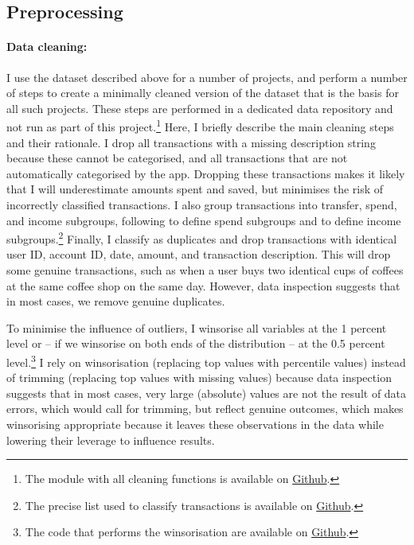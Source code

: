 \subsection{Preprocessing}%
\label{sub:preprocessing}

\paragraph{Data cleaning:}%
\label{par:data_cleaning}

I use the dataset described above for a number of projects, and perform a
number of steps to create a minimally cleaned version of the dataset that is
the basis for all such projects. These steps are performed in a dedicated data
repository and not run as part of this project.\footnote{The module with all
cleaning functions is available on
\href{https:/egithub.com/fabiangunzinger/mdb_eval/blob/f51e49c95c5884d2dc417be23921a8acd85aec9d/src/data/clean.py}{Github}.}
Here, I briefly describe the main cleaning steps and their rationale. I drop
all transactions with a missing description string because these cannot be
categorised, and all transactions that are not automatically categorised by
the app. Dropping these transactions makes it likely that I will underestimate
amounts spent and saved, but minimises the risk of incorrectly classified
transactions. I also group transactions into transfer, spend, and income
subgroups, following \citet{muggleton2020evidence} to define spend subgroups
and \citet{hacioglu2021distributional} to define income subgroups.\footnote{
The precise list used to classify transactions is available on
\href{https://github.com/fabiangunzinger/mdb_eval/blob/92af366d4c4052cc7a7f78a6178086de8ecdfb75/src/data/txn_classifications.py}{Github}.}
Finally, I classify as duplicates and drop transactions with identical user ID,
account ID, date, amount, and transaction description. This will drop some
genuine transactions, such as when a user buys two identical cups of coffees at
the same coffee shop on the same day. However, data inspection suggests that in
most cases, we remove genuine duplicates.

To minimise the influence of outliers, I winsorise all variables at the 1
percent level or -- if we winsorise on both ends of the distribution -- at the
0.5 percent level.\footnote{The code that performs the winsorisation are
    available on
\href{https://github.com/fabiangunzinger/mdb_eval/blob/d04fe186bb5cca884af2b7c1c7ad429674ef701d/src/data/transformers.py}{Github}.}
I rely on winsorisation (replacing top values with percentile values) instead
of trimming (replacing top values with missing values) because data inspection
suggests that in most cases, very large (absolute) values are not the result of
data errors, which would call for trimming, but reflect genuine outcomes, which
makes winsorising appropriate because it leaves these observations in the data
while lowering their leverage to influence results.


